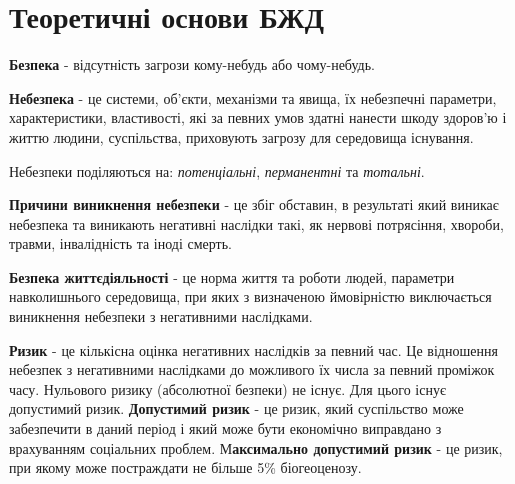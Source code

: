 \section{Теоретичні основи БЖД}
\textbf{Безпека }- відсутність загрози кому-небудь або чому-небудь.

\textbf{Небезпека} - це системи, об’єкти, механізми та явища, їх небезпечні параметри, характеристики, властивості, які за певних умов здатні нанести шкоду здоров’ю і життю людини, суспільства, приховують загрозу для середовища існування.

Небезпеки поділяються на:\textit{ потенціальні}, \textit{перманентні} та \textit{тотальні}.

\textbf{Причини виникнення небезпеки} - це збіг обставин, в результаті який виникає небезпека та виникають негативні наслідки такі, як нервові потрясіння, хвороби, травми, інвалідність та іноді смерть.

\textbf{Безпека життєдіяльності}  - це норма життя та роботи людей, параметри навколишнього середовища, при яких з визначеною ймовірністю виключається виникнення небезпеки з негативними наслідками.

\textbf{Ризик} - це кількісна оцінка негативних наслідків за певний час. Це відношення небезпек з негативними наслідками до можливого їх числа за певний проміжок часу. Нульового ризику (абсолютної безпеки) не існує. Для цього існує допустимий ризик. \textbf{Допустимий ризик }- це ризик, який суспільство може забезпечити в даний період і який може бути економічно виправдано з врахуванням соціальних проблем. М\textbf{аксимально допустимий ризик} - це ризик, при якому може постраждати не більше 5\% біогеоценозу.